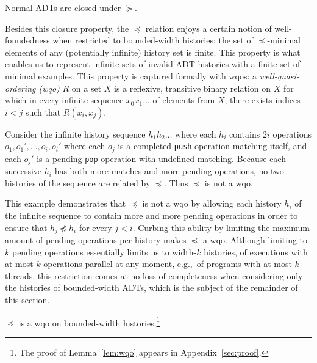 \begin{lemma}
  \label{lem:ADT_closure}

  Normal ADTs are closed under $\succeq$.

\end{lemma}

Besides this closure property, the $\preceq$ relation enjoys a certain notion of
well-foundedness when restricted to bounded-width histories: the set of
$\preceq$-minimal elements of any (potentially infinite) history set is finite.
This property is what enables us to represent infinite sets of invalid ADT
histories with a finite set of minimal examples. This property is captured
formally with wqos: a \emph{well-quasi-ordering (wqo)} $R$ on a set $X$ is a
reflexive, transitive binary relation on $X$ for which in every infinite
sequence $x_0 x_1 \ldots$ of elements from $X$, there exists indices $i < j$
such that $R(x_i,x_j)$.

\begin{example}

  Consider the infinite history sequence $h_1 h_2 \ldots$ where each $h_i$
  contains $2i$ operations $o_1, o_1', \ldots, o_i, o_i'$ where each $o_j$ is a
  completed {\tt push} operation matching itself, and each $o_j'$ is a pending
  {\tt pop} operation with undefined matching. Because each successive $h_i$
  has both more matches and more pending operations, no two histories of the
  sequence are related by $\preceq$. Thus $\preceq$ is not a wqo.

\end{example}

This example demonstrates that $\preceq$ is not a wqo by allowing each history
$h_i$ of the infinite sequence to contain more and more pending operations in
order to ensure that $h_j \not\preceq h_i$ for every $j < i$. Curbing this
ability by limiting the maximum amount of pending operations per history makes
$\preceq$ a wqo. Although limiting to $k$ pending operations essentially limits
us to width-$k$ histories, of executions with at most $k$ operations parallel at
any moment, e.g.,~of programs with at most $k$ threads, this restriction comes
at no loss of completeness when considering only the histories of bounded-width
ADTs, which is the subject of the remainder of this section.

\begin{lemma}
  \label{lem:wqo}

  $\preceq$ is a wqo on bounded-width histories.\footnote{The proof of
  Lemma~\ref{lem:wqo} appears in Appendix~\ref{sec:proof}.}

\end{lemma}

